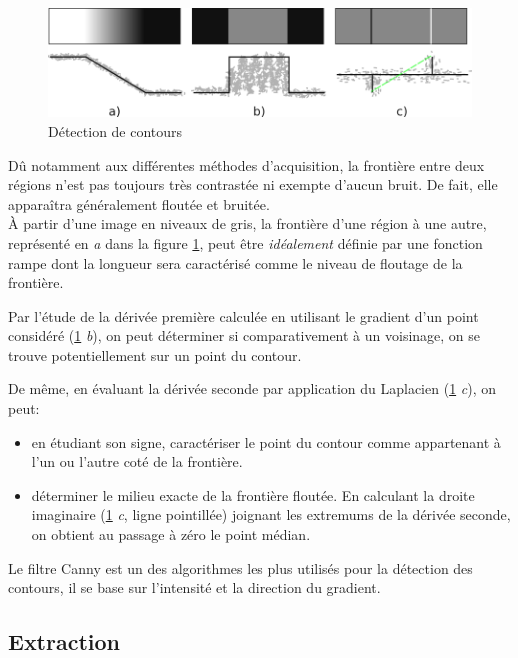 \documentclass[a4paper,12pt]{report}
\begin{document}
\begin{figure}[hbtp]
\centering
\includegraphics[scale=0.6]{figureDetectionDiscontinuities.png}
\caption{Détection de contours}
\label{fig:DetectionDiscontinuities}
\end{figure}

Dû notamment aux différentes méthodes d'acquisition, la frontière entre deux régions n'est pas toujours très contrastée ni exempte d'aucun bruit. De fait, elle apparaîtra généralement floutée et bruitée.\\ 
\`A partir d'une image en niveaux de gris, la frontière d'une région à une autre, représenté en \textit{a} dans la figure \ref{fig:DetectionDiscontinuities}, peut être \textit{idéalement} définie par une fonction rampe dont la longueur sera caractérisé comme le niveau de floutage de la frontière. 

Par l'étude de la dérivée première calculée en utilisant le gradient d'un point considéré (\ref{fig:DetectionDiscontinuities} \textit{b}), on peut déterminer si comparativement à un voisinage, on se trouve potentiellement sur un point du contour. 

De même, en évaluant la dérivée seconde par application du Laplacien (\ref{fig:DetectionDiscontinuities} \textit{c}), on peut:\begin{itemize}
\item en étudiant son signe, caractériser le point du contour comme appartenant à l'un ou l'autre coté de la frontière.
\item déterminer le milieu exacte de la frontière floutée. En calculant la droite imaginaire (\ref{fig:DetectionDiscontinuities} \textit{c}, ligne pointillée) joignant les extremums de la dérivée seconde, on obtient au passage à zéro le point médian.\\
\end{itemize}

Le filtre Canny est un des algorithmes les plus utilisés pour la détection des contours, il se base sur l'intensité et la direction du gradient. \\

\subsection{Extraction}
\end{document}

